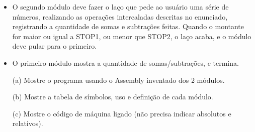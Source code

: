 \begin{enumerate}[resume]
\begin{itemize}
        \item
        O segundo módulo deve fazer o laço
        que pede ao usuário uma série de números,
        realizando as operações intercaladas descritas no enunciado,
        registrando a quantidade de somas e subtrações feitas.
        Quando o montante for maior ou igual a STOP1, ou menor que STOP2,
        o laço acaba, e o módulo deve pular para o primeiro.

        \item
        O primeiro módulo mostra a quantidade de somas/subtrações, e termina.
    \end{itemize}

    \begin{itemize}
        \item [(a)]
        Mostre o programa usando o Assembly inventado dos 2 módulos.

        \item [(b)]
        Mostre a tabela de símbolos, uso e definição de cada módulo.

        \item [(c)]
        Mostre o código de máquina ligado
        (não precisa indicar absolutos e relativos).
    \end{itemize}
\end{enumerate}
